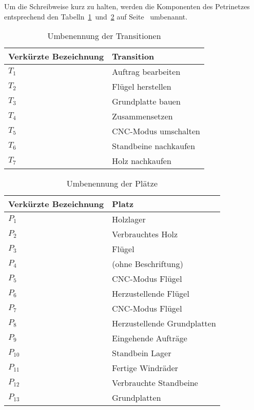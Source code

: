 Um die Schreibweise kurz zu halten, werden die Komponenten des Petrinetzes entsprechend den Tabelln~\ref{tab:rename_transitions}~und~\ref{tab:rename_places} auf Seite~\pageref{tab:rename_transitions} umbenannt.

\begin{table}[p]
\begin{tabularx}{\textwidth}{|p{5cm}|X|}
	\hline
	\textbf{Verkürzte Bezeichnung} & \textbf{Transition} \\ \hline
	$T_1$	& Auftrag bearbeiten		\\ \hline
	$T_2$	& Flügel herstellen			\\ \hline
	$T_3$	& Grundplatte bauen			\\ \hline
	$T_4$	& Zusammensetzen			\\ \hline
	$T_5$	& CNC-Modus umschalten		\\ \hline
	$T_6$	& Standbeine nachkaufen		\\ \hline
	$T_7$	& Holz nachkaufen			\\ \hline
\end{tabularx}
\caption{Umbenennung der Transitionen}
\label{tab:rename_transitions}
\end{table}
\begin{table}[p]
\begin{tabularx}{\textwidth}{|p{5cm}|X|}
	\hline
	\textbf{Verkürzte Bezeichnung} & \textbf{Platz} \\ \hline
	$P_1$		& Holzlager						\\ \hline
	$P_2$		& Verbrauchtes Holz				\\ \hline
	$P_3$		& Flügel						\\ \hline
	$P_4$		& (ohne Beschriftung)			\\ \hline
	$P_5$		& CNC-Modus Flügel				\\ \hline
	$P_6$		& Herzustellende Flügel			\\ \hline
	$P_7$		& CNC-Modus Flügel				\\ \hline
	$P_8$		& Herzustellende Grundplatten	\\ \hline
	$P_9$		& Eingehende Aufträge			\\ \hline
	$P_{10}$	& Standbein Lager				\\ \hline
	$P_{11}$	& Fertige Windräder				\\ \hline
	$P_{12}$	& Verbrauchte Standbeine		\\ \hline
	$P_{13}$	& Grundplatten					\\ \hline
\end{tabularx}
\caption{Umbenennung der Plätze}
\label{tab:rename_places}
\end{table}


